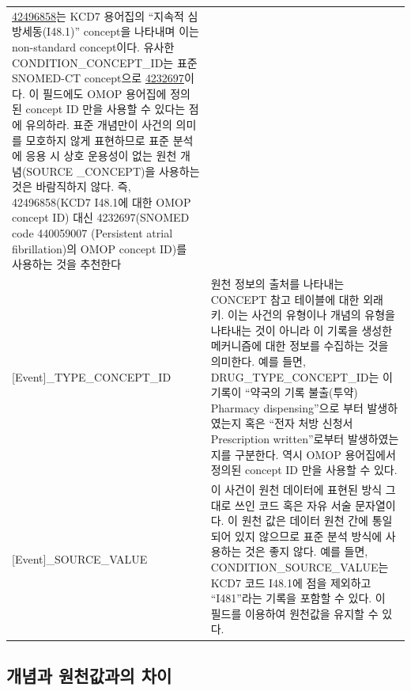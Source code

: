 \documentclass[10.5pt]{book}
\theoremstyle{definition}
\theoremstyle{definition}
\theoremstyle{definition}
\theoremstyle{remark}
\begin{document}
\begin{longtable}[]{@{}ll@{}}
\begin{minipage}[t]{0.60\columnwidth}
\href{http://athena.ohdsi.org/search-terms/terms/42488512}{42496858}는
KCD7 용어집의 ``지속적 심방세동(I48.1)'' concept을 나타내며 이는
non-standard concept이다. 유사한 CONDITION\_CONCEPT\_ID는 표준 SNOMED-CT
concept으로
\href{http://athena.ohdsi.org/search-terms/terms/4232697}{4232697}이다.
이 필드에도 OMOP 용어집에 정의된 concept ID 만을 사용할 수 있다는 점에
유의하라. 표준 개념만이 사건의 의미를 모호하지 않게 표현하므로 표준
분석에 응용 시 상호 운용성이 없는 원천 개념(SOURCE \_CONCEPT)을 사용하는
것은 바람직하지 않다. 즉, 42496858(KCD7 I48.1에 대한 OMOP concept ID)
대신 4232697(SNOMED code 440059007 (Persistent atrial fibrillation)의
OMOP concept ID)를 사용하는 것을 추천한다\strut
\end{minipage}\tabularnewline
\begin{minipage}[t]{0.34\columnwidth}\raggedright\strut
{[}Event{]}\_TYPE\_CONCEPT\_ID\strut
\end{minipage} & \begin{minipage}[t]{0.60\columnwidth}\raggedright\strut
원천 정보의 출처를 나타내는 CONCEPT 참고 테이블에 대한 외래 키. 이는
사건의 유형이나 개념의 유형을 나타내는 것이 아니라 이 기록을 생성한
메커니즘에 대한 정보를 수집하는 것을 의미한다. 예를 들면,
DRUG\_TYPE\_CONCEPT\_ID는 이 기록이 ``약국의 기록 불출(투약) Pharmacy
dispensing''으로 부터 발생하였는지 혹은 ``전자 처방 신청서 Prescription
written''로부터 발생하였는지를 구분한다. 역시 OMOP 용어집에서 정의된
concept ID 만을 사용할 수 있다.\strut
\end{minipage}\tabularnewline
\begin{minipage}[t]{0.34\columnwidth}\raggedright\strut
{[}Event{]}\_SOURCE\_VALUE\strut
\end{minipage} & \begin{minipage}[t]{0.60\columnwidth}\raggedright\strut
이 사건이 원천 데이터에 표현된 방식 그대로 쓰인 코드 혹은 자유 서술
문자열이다. 이 원천 값은 데이터 원천 간에 통일되어 있지 않으므로 표준
분석 방식에 사용하는 것은 좋지 않다. 예를 들면,
CONDITION\_SOURCE\_VALUE는 KCD7 코드 I48.1에 점을 제외하고 ``I481''라는
기록을 포함할 수 있다. 이 필드를 이용하여 원천값을 유지할 수 있다.\strut
\end{minipage}\tabularnewline
\bottomrule
\end{longtable}

\subsection{개념과 원천값과의 차이}\label{concepts-Sources}
\end{document}
